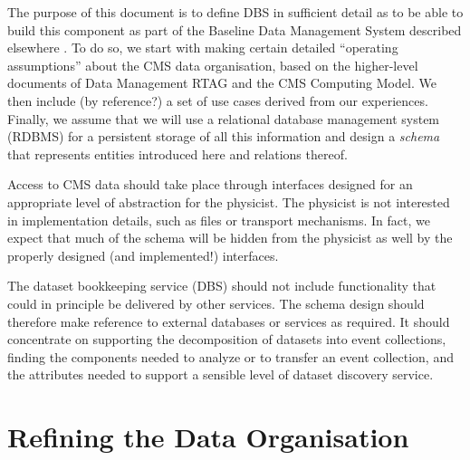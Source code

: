 \documentclass{cmspaper}
\begin{document}
The purpose of this document is to define DBS in sufficient detail as to
be able to build this component as part of the Baseline Data Management
System described elsewhere \cite{dmman}. To do so, we start with making
 certain detailed ``operating assumptions'' about the CMS data organisation, 
based on the higher-level documents of 
Data Management RTAG\cite{rtag7} and the CMS Computing Model\cite{CM}.
We then include (by reference?) a set of use cases derived from
our experiences. Finally, we assume that we will use a relational 
database management system (RDBMS) for a persistent storage
of all this information and design a {\it schema} 
that represents entities introduced
here and relations thereof. 

Access to CMS data should take place through interfaces designed for an 
appropriate level of abstraction for the physicist.  The physicist is not 
interested in implementation details, such as files or transport mechanisms. 
In fact, we expect that much of the schema will be hidden from the physicist
as well by the properly designed (and implemented!) interfaces.

The dataset bookkeeping service (DBS) should not include functionality that could in 
principle be delivered by other services.  The schema design should therefore make 
reference to external databases or services as required.  It should 
concentrate on supporting the decomposition of datasets into event collections, finding the 
components needed to analyze or to transfer an event collection, and the attributes 
needed to support a sensible level of dataset discovery service.  



\section{Refining the Data Organisation}
\end{document}
